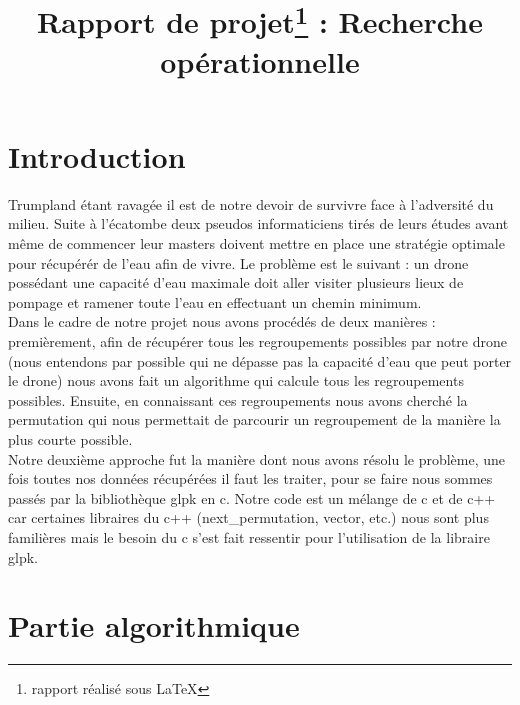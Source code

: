 \documentclass[a4paper,sffamily,12pt]{article}
\title{\vspace{\fill}\LARGE\bfseries\sffamily Rapport de projet\protect\footnote{rapport réalisé sous \LaTeX} : Recherche opérationnelle\vspace{\fill}}
\begin{document}
	\date{} %
	\maketitle %

	\thispagestyle{fancy} %
	
	\newpage
			
	\renewcommand{\contentsname}{Sommaire}
	\tableofcontents
	
	\newpage
	
	\section{Introduction}
	
		\vspace{0.5cm}

		Trumpland étant ravagée il est de notre devoir de survivre face à l'adversité du milieu. Suite à l'écatombe deux pseudos informaticiens tirés de leurs études avant même de commencer leur masters doivent mettre en place une stratégie optimale pour récupérér de l'eau afin de vivre. Le problème est le suivant : un drone possédant une capacité d'eau maximale doit aller visiter plusieurs lieux de pompage et ramener toute l'eau en effectuant un chemin minimum.\\
		\indent Dans le cadre de notre projet nous avons procédés de deux manières : premièrement, afin de récupérer tous les regroupements possibles par notre drone (nous entendons par possible qui ne dépasse pas la capacité d'eau que peut porter le drone) nous avons fait un algorithme qui calcule tous les regroupements possibles. Ensuite, en connaissant ces regroupements nous avons cherché la permutation qui nous permettait de parcourir un regroupement de la manière la plus courte possible. \\
		\indent Notre deuxième approche fut la manière dont nous avons résolu le problème, une fois toutes nos données récupérées il faut les traiter, pour se faire nous sommes passés par la bibliothèque glpk en c. Notre code est un mélange de c et de c++ car certaines libraires du c++ (next\_permutation, vector, etc.) nous sont plus familières mais le besoin du c s'est fait ressentir pour l'utilisation de la libraire glpk.

	\section{Partie algorithmique}
	
\end{document}
